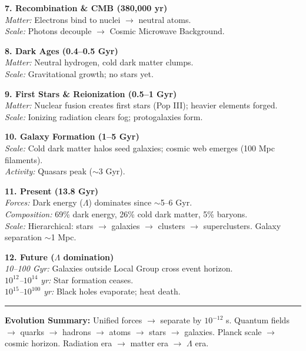 \begin{center}
\begin{tcolorbox}
\textbf{7. Recombination \& CMB (380,000 yr)}\\
\textit{Matter:} Electrons bind to nuclei $\rightarrow$ neutral atoms.\\
\textit{Scale:} Photons decouple $\rightarrow$ Cosmic Microwave Background.

\textbf{8. Dark Ages (0.4–0.5 Gyr)}\\
\textit{Matter:} Neutral hydrogen, cold dark matter clumps.\\
\textit{Scale:} Gravitational growth; no stars yet.

\textbf{9. First Stars \& Reionization (0.5–1 Gyr)}\\
\textit{Matter:} Nuclear fusion creates first stars (Pop III); heavier elements forged.\\
\textit{Scale:} Ionizing radiation clears fog; protogalaxies form.

\textbf{10. Galaxy Formation (1–5 Gyr)}\\
\textit{Scale:} Cold dark matter halos seed galaxies; cosmic web emerges (100 Mpc filaments).\\
\textit{Activity:} Quasars peak ($\sim$3 Gyr).

\textbf{11. Present (13.8 Gyr)}\\
\textit{Forces:} Dark energy ($\Lambda$) dominates since $\sim$5–6 Gyr.\\
\textit{Composition:} 69\% dark energy, 26\% cold dark matter, 5\% baryons.\\
\textit{Scale:} Hierarchical: stars $\rightarrow$ galaxies $\rightarrow$ clusters $\rightarrow$ superclusters. Galaxy separation $\sim$1 Mpc.

\textbf{12. Future ($\Lambda$ domination)}\\
\textit{10–100 Gyr:} Galaxies outside Local Group cross event horizon.\\
\textit{$10^{12}$–$10^{14}$ yr:} Star formation ceases.\\
\textit{$10^{15}$–$10^{100}$ yr:} Black holes evaporate; heat death.

\hrule
\vspace{2pt}
\textbf{Evolution Summary:} Unified forces $\rightarrow$ separate by $10^{-12}$ s. Quantum fields $\rightarrow$ quarks $\rightarrow$ hadrons $\rightarrow$ atoms $\rightarrow$ stars $\rightarrow$ galaxies. Planck scale $\rightarrow$ cosmic horizon. Radiation era $\rightarrow$ matter era $\rightarrow$ $\Lambda$ era.

\end{tcolorbox}
\end{center}
